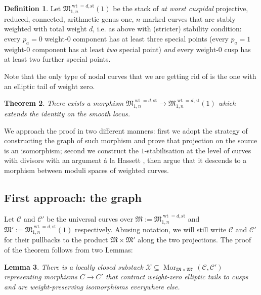 \documentclass[11pt]{amsart}
\renewcommand{\to}{\rightarrow}
\theoremstyle{plain}
\newtheorem{thm}{Theorem}[section]
\newtheorem{lem}[thm]{Lemma}
\theoremstyle{definition}
\newtheorem{dfn}[thm]{Definition}
\begin{document}
\begin{dfn}
Let $\mathfrak M_{1,n}^{\operatorname{wt}=d,\text{st}}(1)$ be the stack of \emph{at worst cuspidal} projective, reduced, connected, arithmetic genus one, $n$-marked curves that are stably weighted with total weight $d$, i.e. as above with (stricter) stability condition: every $p_a=0$ weight-0 component has at least three special points (every $p_a=1$ weight-0 component has at least \emph{two} special point) \emph{and} every weight-0 cusp has at least two further special points.
\end{dfn}

Note that the only type of nodal curves that we are getting rid of is the one with an elliptic tail of weight zero.

\begin{thm}
There exists a morphism $\mathfrak M_{1,n}^{\operatorname{wt}=d,\text{st}}\to\mathfrak M_{1,n}^{\operatorname{wt}=d,\text{st}}(1)$ which extends the identity on the smooth locus.
\end{thm} 
We approach the proof in two different manners: first we adopt the strategy of constructing the graph of such morphism and prove that projection on the source is an isomorphism; second we construct the $1$-stabilisation at the level of curves with divisors with an argument \'{a} la Hassett \cite{HassettHyeon}, then argue that it descends to a morphism between moduli spaces of weighted curves.

\subsection{First approach: the graph}

Let $\mathcal C$ and $\mathcal C'$ be the universal curves over $\mathfrak{M}:=\mathfrak M_{1,n}^{\operatorname{wt}=d,\text{st}}$ and $\mathfrak{M}':=\mathfrak M_{1,n}^{\operatorname{wt}=d,\text{st}}(1)$ respectively. Abusing notation, we will still write $\mathcal C$ and $\mathcal C'$ for their pullbacks to the product $\mathfrak{M}\times\mathfrak{M}'$ along the two projections. The proof of the theorem follows from two Lemmas:

\begin{lem}\label{lemma:def_X}
 There is a locally closed substack $\mathcal X\subseteq\operatorname{Mor}_{\mathfrak{M}\times\mathfrak{M}'}(\mathcal C,\mathcal C')$ representing morphisms $C\to C'$ that contract weight-zero elliptic tails to cusps and are weight-preserving isomorphisms everywhere else. 
\end{lem}
\end{document}
